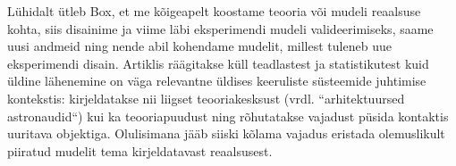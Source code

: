\documentclass{article}
\begin{document}
Lühidalt ütleb Box, et me kõigeapelt koostame teooria või mudeli reaalsuse kohta, siis disainime ja viime läbi eksperimendi mudeli valideerimiseks, saame uusi andmeid ning nende abil kohendame mudelit, millest tuleneb uue eksperimendi disain. Artiklis räägitakse küll teadlastest ja statistikutest kuid üldine lähenemine on  väga relevantne üldises keeruliste süsteemide juhtimise kontekstis: kirjeldatakse nii liigset teooriakesksust (vrdl. ``arhitektuursed astronaudid``) kui ka teooriapuudust ning rõhutatakse vajadust püsida kontaktis uuritava objektiga. Olulisimana jääb siiski kõlama vajadus eristada olemuslikult piiratud mudelit tema kirjeldatavast reaalsusest.  

\nocite{*}

 
\end{document}
